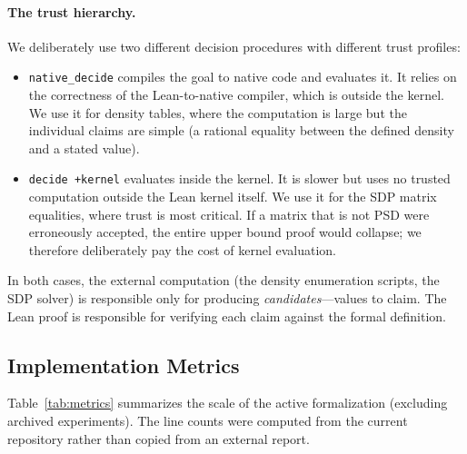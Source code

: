 \documentclass{article}
\newcommand{\lean}[1]{\texttt{#1}}
\begin{document}
\paragraph{The trust hierarchy.}
We deliberately use two different decision procedures with different trust
profiles:
\begin{itemize}
  \item \lean{native\_decide} compiles the goal to native code and evaluates
    it.  It relies on the correctness of the Lean-to-native compiler, which is
    outside the kernel.  We use it for density tables, where the computation is
    large but the individual claims are simple (a rational equality between the
    defined density and a stated value).

  \item \lean{decide +kernel} evaluates inside the kernel.  It is slower but
    uses no trusted computation outside the Lean kernel itself.  We use it for
    the SDP matrix equalities, where trust is most critical.  If a matrix
    that is not PSD were erroneously accepted, the entire upper bound proof
    would collapse; we therefore deliberately pay the cost of kernel evaluation.
\end{itemize}
In both cases, the external computation (the density enumeration scripts, the
SDP solver) is responsible only for producing \emph{candidates}---values to
claim.  The Lean proof is responsible for verifying each claim against the
formal definition.

\subsection{Implementation Metrics}

Table~\ref{tab:metrics} summarizes the scale of the active formalization
(excluding archived experiments).  The line counts were computed from the
current repository rather than copied from an external report.
\end{document}
